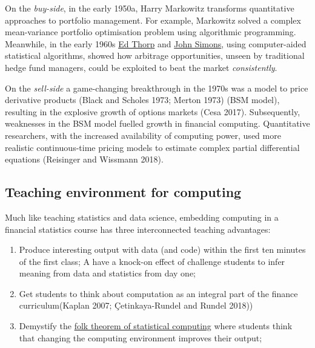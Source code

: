 \documentclass{article}
\begin{document}
On the \emph{buy-side}, in the early 1950a, Harry Markowitz transforms
quantitative approaches to portfolio management. For example, Markowitz
solved a complex mean-variance portfolio optimisation problem using
algorithmic programming. Meanwhile, in the early 1960s
\href{https://en.wikipedia.org/wiki/Edward_O._Thorp}{Ed Thorp} and
\href{https://en.wikipedia.org/wiki/Jim_Simons_(mathematician)}{John
Simons}, using computer-aided statistical algorithms, showed how
arbitrage opportunities, unseen by traditional hedge fund managers,
could be exploited to beat the market \emph{consistently}.

On the \emph{sell-side} a game-changing breakthrough in the 1970s was a
model to price derivative products (Black and Scholes 1973; Merton 1973)
(BSM model), resulting in the explosive growth of options markets (Cesa
2017). Subsequently, weaknesses in the BSM model fuelled growth in
financial computing. Quantitative researchers, with the increased
availability of computing power, used more realistic continuous-time
pricing models to estimate complex partial differential equations
(Reisinger and Wissmann 2018).

\hypertarget{teaching-environment-for-computing}{%
\subsection{Teaching environment for
computing}\label{teaching-environment-for-computing}}

Much like teaching statistics and data science, embedding computing in a
financial statistics course has three interconnected teaching
advantages:

\begin{enumerate}
\def\labelenumi{\arabic{enumi}.}
\tightlist
\item
  Produce interesting output with data (and code) within the first ten
  minutes of the first class; A have a knock-on effect of challenge
  students to infer meaning from data and statistics from day one;
\item
  Get students to think about computation as an integral part of the
  finance curriculum(Kaplan 2007; Çetinkaya-Rundel and Rundel 2018))
\item
  Demystify the
  \href{https://statmodeling.stat.columbia.edu/2008/05/13/the_folk_theore/}{folk
  theorem of statistical computing} where students think that changing
  the computing environment improves their output;
\end{enumerate}
\end{document}
